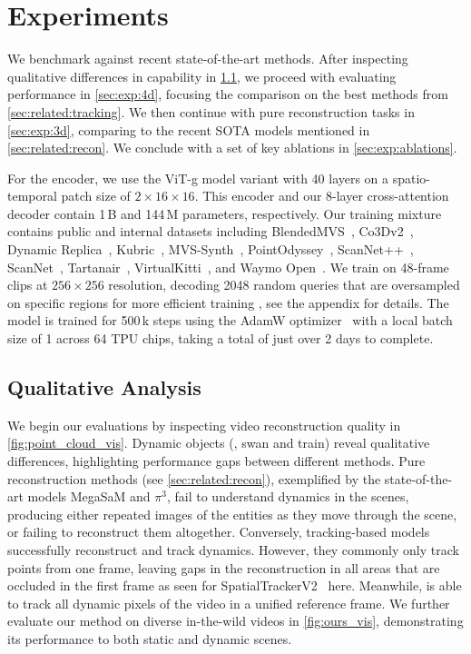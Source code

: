 \section{Experiments}
\label{sec:exp}

We benchmark \name against recent state-of-the-art methods.
After inspecting qualitative differences in capability in \cref{sec:exp:qualitative}, we proceed with evaluating \task performance in \cref{sec:exp:4d}, focusing the comparison on the best methods from \cref{sec:related:tracking}.
We then continue with pure reconstruction tasks in \cref{sec:exp:3d}, comparing to the recent SOTA models mentioned in \cref{sec:related:recon}.
We conclude with a set of key ablations in \cref{sec:exp:ablations}.

For the encoder, we use the ViT-g model variant with 40 layers on a spatio-temporal patch size of $2{\times}16{\times}16$.
This encoder and our 8-layer cross-attention decoder contain 1\,B and 144\,M parameters, respectively.
Our training mixture contains public and internal datasets including
BlendedMVS~\cite{yao2020blendedmvs},
Co3Dv2~\cite{reizenstein2021common},
Dynamic Replica~\cite{karaev2023dynamicstereo},
Kubric~\cite{movi-e},
MVS-Synth~\cite{DeepMVS},
PointOdyssey~\cite{PointOdyssey}, ScanNet++~\cite{yeshwanthliu2023scannetpp},
ScanNet~\cite{dai2017scannet},
Tartanair~\cite{tartanair2020iros},
VirtualKitti~\cite{virtual_kitti}, and
Waymo Open~\cite{Sun_2020_CVPR}.
We train on 48-frame clips at $256{\times}256$ resolution, decoding 2048 random queries that are oversampled on specific regions for more efficient training
, see the appendix for details.
The model is trained for 500\,k steps using the AdamW optimizer~\cite{adam, adamw} with a local batch size of 1 across 64 TPU chips, taking a total of just over 2 days to complete.





\subsection{Qualitative Analysis}
\label{sec:exp:qualitative}

We begin our evaluations by inspecting video reconstruction quality in \cref{fig:point_cloud_vis}.
Dynamic objects (\eg, swan and train) reveal qualitative differences, highlighting performance gaps between different methods.
Pure reconstruction methods (see \cref{sec:related:recon}), exemplified by the state-of-the-art models MegaSaM and $\pi^3$, fail to understand dynamics in the scenes, producing either repeated images of the entities as they move through the scene, or failing to reconstruct them altogether.
Conversely, tracking-based models successfully reconstruct and track dynamics.
However, they commonly only track points from one frame, leaving gaps in the reconstruction in all areas that are occluded in the first frame as seen for SpatialTrackerV2~\cite{xiao2025spatialtrackerv2} here.
Meanwhile, \name is able to track all dynamic pixels of the video in a unified reference frame.
We further evaluate our method on diverse in-the-wild videos in \cref{fig:ours_vis}, demonstrating its performance to both static and dynamic scenes.


